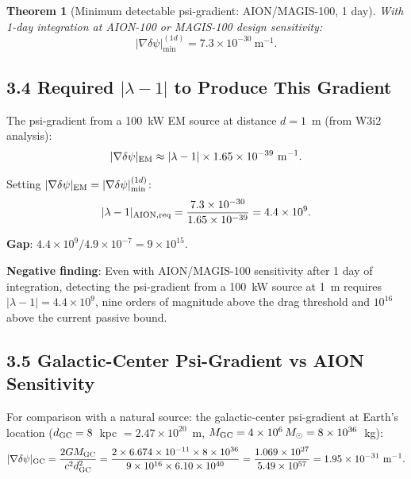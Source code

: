 \documentclass[11pt,twocolumn]{article}
\newcommand{\dpsi}{\delta\psi}
\newcommand{\lam}{\lambda}
\newtheorem{theorem}{Theorem}
\begin{document}
\begin{theorem}[Minimum detectable psi-gradient: AION/MAGIS-100, 1 day]
\label{thm:aion}
With 1-day integration at AION-100 or MAGIS-100 design sensitivity:
\begin{equation}
\boxed{
|\nabla\dpsi|_{\min}^{(1d)} = 7.3\times10^{-30}~\text{m}^{-1}.
}
\end{equation}
\end{theorem}

\subsection*{3.4 Required $|\lam-1|$ to Produce This Gradient}

The psi-gradient from a 100~kW EM source at distance $d = 1$~m
(from W3i2 analysis):
\begin{equation}
|\nabla\dpsi|_{\rm EM} \approx |\lam-1|\times1.65\times10^{-39}~\text{m}^{-1}.
\label{eq:gradient_EM_source}
\end{equation}

Setting $|\nabla\dpsi|_{\rm EM} = |\nabla\dpsi|_{\min}^{(1d)}$:
\begin{equation}
|\lam-1|_{\rm AION,req} = \frac{7.3\times10^{-30}}{1.65\times10^{-39}}
= 4.4\times10^9.
\label{eq:lambda_AION}
\end{equation}

\textbf{Gap}: $4.4\times10^9 / 4.9\times10^{-7} = 9\times10^{15}$.

\textbf{Negative finding}: Even with AION/MAGIS-100 sensitivity after
1 day of integration, detecting the psi-gradient from a 100~kW source
at 1~m requires $|\lam-1| = 4.4\times10^9$, nine orders of magnitude
above the drag threshold and $10^{16}$ above the current passive bound.

\subsection*{3.5 Galactic-Center Psi-Gradient vs AION Sensitivity}

For comparison with a natural source: the galactic-center psi-gradient
at Earth's location ($d_{\rm GC} = 8$~kpc $= 2.47\times10^{20}$~m,
$M_{\rm GC} = 4\times10^6\,M_\odot = 8\times10^{36}$~kg):
\begin{equation}
|\nabla\dpsi|_{\rm GC} = \frac{2GM_{\rm GC}}{c^2 d_{\rm GC}^2}
= \frac{2\times6.674\times10^{-11}\times8\times10^{36}}
  {9\times10^{16}\times6.10\times10^{40}}
= \frac{1.069\times10^{27}}{5.49\times10^{57}}
= 1.95\times10^{-31}~\text{m}^{-1}.
\label{eq:GC_gradient}
\end{equation}
\end{document}
